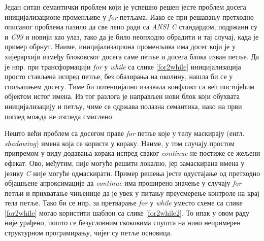 \documentclass[a4paper]{article}
\begin{document}
Један ситан семантички проблем који је успешно решен јесте проблем досега иницијализационе променљиве у \textit{for} петљама. Иако се при решавању претходно описаног проблема пазило да све лепо ради са \textit{ANSI C} стандардом, подржани су и \textit{C99} и новији као улаз, тако да је било неопходно обрадити и тај случај, када је пример обрнут. Наиме, иницијализациона променљива има досег који је у хијерархији између блоковског досега саме петље и досега блока изван петље. Да је нпр. при трансформацији \textit{for} у \textit{while} са слике \ref{for2while} иницијализација просто стављена испред петље, без обазирања на околину, нашла би се у спољашњем досегу. Тиме би потенцијално изазвала конфликт са већ постојећим објектом истог имена. Из тог разлога је направљен нови блок који обухвата иницијализацију и петљу, чиме се одржава полазна семантика, иако на први поглед можда не изгледа смислено.

Нешто већи проблем са досегом праве \textit{for} петље које у телу маскирају (енгл. \textit{shadowing}) имена која се користе у кораку. Наиме, у том случају простом припремом у виду додавања корака испред сваког \textit{continue} не постиже се жељени ефекат. Ово, међутим, није могуће решити локално, јер замаскирана имена у језику \textit{C} није могуће одмаскирати. Пример решења јесте одустајање од претходно објашњене апроксимације да \textit{continue} има проширено значење у случају \textit{for} петљи и прихватање чињенице да је увек у питању преусмерење контроле на крај тела петље. Тако би се нпр. за претварање \textit{for} у \textit{while} уместо схеме са слике \ref{for2while} могао користити шаблон са слике \ref{for2while2}. То ипак у овом раду није урађено, пошто се безусловним скоковима спушта на ниво непримерен структурном програмирању, чијег су петље основица.
\end{document}
